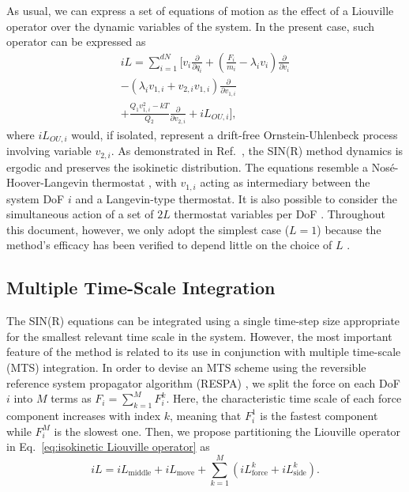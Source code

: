\documentclass[
    journal=jctcce,
    layout=twocolumn
]{achemso}
\newcommand{\diff}[2]{\frac{\partial #2}{\partial #1}} %
\newcommand{\dof}{i}   %
\newcommand{\Liu}{i\!L}
\begin{document}
As usual, we can express a set of equations of motion as the effect of a Liouville operator over the dynamic variables of the system.
In the present case, such operator can be expressed as
\begin{multline}
\label{eq:isokinetic Liouville operator}
\Liu = \sum_{\dof=1}^{dN} \bigg[ v_\dof\diff{q_\dof}{} + \left(\frac{F_\dof}{m_\dof} - \lambda_\dof v_\dof\right)\diff{v_\dof}{} \\
- \left( \lambda_\dof v_{1,\dof} + v_{2,\dof} v_{1,\dof} \right) \diff{v_{1,\dof}}{} \\
+ \tfrac{Q_1 v_{1,\dof}^2 - kT}{Q_2}\diff{v_{2,\dof}}{}
+ \Liu_{OU,\dof} \bigg],
\end{multline}
where $\Liu_{OU,\dof}$ would, if isolated, represent a drift-free Ornstein-Uhlenbeck process involving variable $v_{2,\dof}$.
As demonstrated in Ref.~, the SIN(R) method dynamics is ergodic and preserves the isokinetic distribution.
The equations resemble a Nos\'{e}-Hoover-Langevin thermostat \cite{Samoletov_2007, Leimkuhler_2009}, with $v_{1,\dof}$ acting as intermediary between the system DoF $\dof$ and a Langevin-type thermostat.
It is also possible to consider the simultaneous action of a set of $2L$ thermostat variables per DoF \cite{Minary_2003, Minary_2003_2}.
Throughout this document, however, we only adopt the simplest case ($L=1$) because the method's efficacy has been verified to depend little on the choice of $L$ \cite{Leimkuhler_2013, Margul_2016}.

\subsection{Multiple Time-Scale Integration}

The SIN(R) equations can be integrated using a single time-step size appropriate for the smallest relevant time scale in the system.
However, the most important feature of the method is related to its use in conjunction with multiple time-scale (MTS) integration.
In order to devise an MTS scheme using the reversible reference system propagator algorithm (RESPA) \cite{Tuckerman_1992}, we split the force on each DoF $\dof$ into $M$ terms as $F_\dof = \sum_{k=1}^M F_\dof^k$.
Here, the characteristic time scale of each force component increases with index $k$, meaning that $F_\dof^1$ is the fastest component while $F_\dof^M$ is the slowest one.
Then, we propose partitioning the Liouville operator in Eq.~\eqref{eq:isokinetic Liouville operator} as
\begin{equation}
\label{eq:RESPA Liouville Operator}
\Liu = \Liu_\mathrm{middle} + \Liu_\mathrm{move} + \sum_{k=1}^M \left( \Liu_\mathrm{force}^k + \Liu_\mathrm{side}^k \right).
\end{equation}
\end{document}
